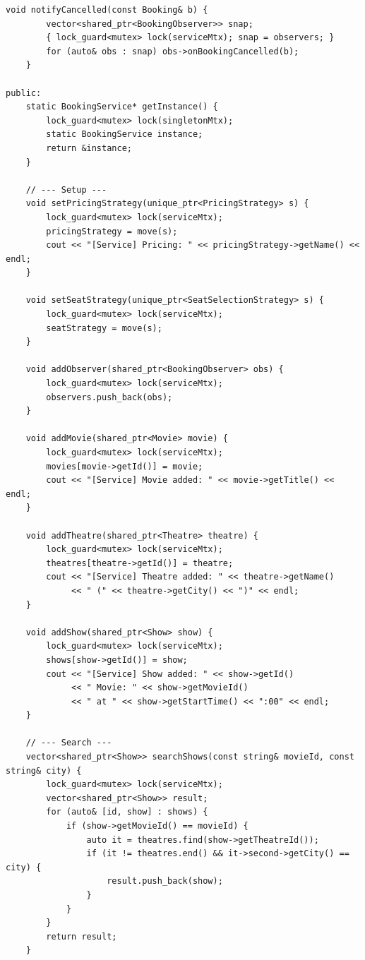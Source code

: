 \documentclass[11pt,a4paper]{article}
\begin{document}
\begin{lstlisting}[title={\texttt{managers.hpp}}]
    void notifyCancelled(const Booking& b) {
        vector<shared_ptr<BookingObserver>> snap;
        { lock_guard<mutex> lock(serviceMtx); snap = observers; }
        for (auto& obs : snap) obs->onBookingCancelled(b);
    }

public:
    static BookingService* getInstance() {
        lock_guard<mutex> lock(singletonMtx);
        static BookingService instance;
        return &instance;
    }

    // --- Setup ---
    void setPricingStrategy(unique_ptr<PricingStrategy> s) {
        lock_guard<mutex> lock(serviceMtx);
        pricingStrategy = move(s);
        cout << "[Service] Pricing: " << pricingStrategy->getName() << endl;
    }

    void setSeatStrategy(unique_ptr<SeatSelectionStrategy> s) {
        lock_guard<mutex> lock(serviceMtx);
        seatStrategy = move(s);
    }

    void addObserver(shared_ptr<BookingObserver> obs) {
        lock_guard<mutex> lock(serviceMtx);
        observers.push_back(obs);
    }

    void addMovie(shared_ptr<Movie> movie) {
        lock_guard<mutex> lock(serviceMtx);
        movies[movie->getId()] = movie;
        cout << "[Service] Movie added: " << movie->getTitle() << endl;
    }

    void addTheatre(shared_ptr<Theatre> theatre) {
        lock_guard<mutex> lock(serviceMtx);
        theatres[theatre->getId()] = theatre;
        cout << "[Service] Theatre added: " << theatre->getName()
             << " (" << theatre->getCity() << ")" << endl;
    }

    void addShow(shared_ptr<Show> show) {
        lock_guard<mutex> lock(serviceMtx);
        shows[show->getId()] = show;
        cout << "[Service] Show added: " << show->getId()
             << " Movie: " << show->getMovieId()
             << " at " << show->getStartTime() << ":00" << endl;
    }

    // --- Search ---
    vector<shared_ptr<Show>> searchShows(const string& movieId, const string& city) {
        lock_guard<mutex> lock(serviceMtx);
        vector<shared_ptr<Show>> result;
        for (auto& [id, show] : shows) {
            if (show->getMovieId() == movieId) {
                auto it = theatres.find(show->getTheatreId());
                if (it != theatres.end() && it->second->getCity() == city) {
                    result.push_back(show);
                }
            }
        }
        return result;
    }


\end{lstlisting}
\end{document}
